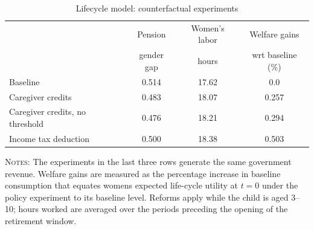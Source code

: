 \begin{table}[htbp]\centering\begin{threeparttable}\caption{Lifecycle model: counterfactual experiments}\label{table:experiments}\footnotesize\begin{tabular}{lccc} \toprule & Pension & Women's labor &  Welfare gains  \\&gender gap &hours & wrt baseline (\%)  \\\midrule    Baseline                                   &0.514&17.62& 0.0\\ Caregiver credits                          &0.483&18.07&0.257\\ Caregiver credits, no threshold            &0.476&18.21&0.294\\ Income tax deduction                       &0.500&18.38&0.503\\ \bottomrule\end{tabular}\begin{tablenotes}[flushleft]\footnotesize\item  \textsc{Notes:} The experiments in the last three rows generate the same government revenue. Welfare gains are measured as the percentage increase in baseline consumption that equates womens expected life-cycle utility at $t=0$ under the policy experiment to its baseline level. Reforms apply while the child is aged 3--10; hours worked are averaged over the periods preceding the opening of the retirement window.\\\end{tablenotes}\end{threeparttable}\end{table}